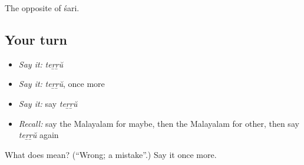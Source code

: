 \begin{grammarlens}[title={What you've built}]
The opposite of śari.
\end{grammarlens}

\subsection*{Your turn}
\begin{itemize}
\raggedright
  \item \emph{Say it:} \emph{teṟṟŭ}
  \item \emph{Say it:} \emph{teṟṟŭ}, once more
  \item \emph{Say it:} say \emph{teṟṟŭ}
  \item \emph{Recall:} say the Malayalam for maybe, then the Malayalam for other, then say \emph{teṟṟŭ} again
\end{itemize}

\begin{tcolorbox}[breakable,colback=teal!4,colframe=teal!35!black,title={Before you move on}]
What does  mean? (\textquotedblleft{}Wrong; a mistake\textquotedblright{}.) Say it once more.
\end{tcolorbox}
